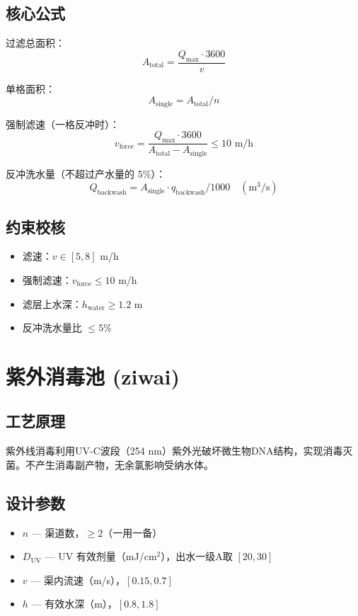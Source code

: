 \documentclass[12pt,a4paper]{ctexart}
\begin{document}
\subsection{核心公式}
过滤总面积：
\begin{equation}
A_{\text{total}} = \frac{Q_{\text{max}} \cdot 3600}{v}
\end{equation}

单格面积：
\begin{equation}
A_{\text{single}} = A_{\text{total}} / n
\end{equation}

强制滤速（一格反冲时）：
\begin{equation}
v_{\text{force}} = \frac{Q_{\text{max}} \cdot 3600}{A_{\text{total}} - A_{\text{single}}} \le 10 \text{ m/h}
\end{equation}

反冲洗水量（不超过产水量的 5\%）：
\begin{equation}
Q_{\text{backwash}} = A_{\text{single}} \cdot q_{\text{backwash}} / 1000 \quad (\text{m}^3/\text{s})
\end{equation}

\subsection{约束校核}
\begin{itemize}
  \item 滤速：$v \in [5, 8]$ m/h
  \item 强制滤速：$v_{\text{force}} \le 10$ m/h
  \item 滤层上水深：$h_{\text{water}} \ge 1.2$ m
  \item 反冲洗水量比 $\le 5\%$
\end{itemize}

\section{紫外消毒池 (ziwai)}

\subsection{工艺原理}
紫外线消毒利用UV-C波段（254 nm）紫外光破坏微生物DNA结构，实现消毒灭菌。不产生消毒副产物，无余氯影响受纳水体。

\subsection{设计参数}
\begin{itemize}
  \item $n$ — 渠道数，$\ge 2$（一用一备）
  \item $D_{\text{UV}}$ — UV 有效剂量（mJ/cm$^2$），出水一级A取 $[20, 30]$
  \item $v$ — 渠内流速（m/s），$[0.15, 0.7]$
  \item $h$ — 有效水深（m），$[0.8, 1.8]$
\end{itemize}
\end{document}
